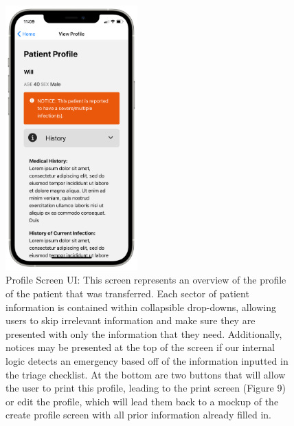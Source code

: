 \documentclass[11pt,letterpaper]{article}
\begin{document}
\begin{figure}
    \centering
    \includegraphics[width=2in]{Screenshots/prs.png}
    \caption{Profile Screen UI: This screen represents an overview of the profile of the patient that was transferred. Each sector of patient information is contained within collapsible drop-downs, allowing users to skip irrelevant information and make sure they are presented with only the information that they need. Additionally, notices may be presented at the top of the screen if our internal logic detects an emergency based off of the information inputted in the triage checklist.  At the bottom are two buttons that will allow the user to print this profile, leading to the print screen (Figure 9) or edit the profile, which will lead them back to a mockup of the create profile screen with all prior information already filled in.}
    \label{fig:receivescreen}
\end{figure}
\end{document}
